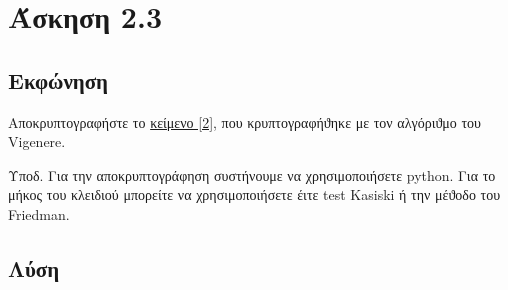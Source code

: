 \section{Άσκηση 2.3}

\subsection{Εκφώνηση} 

Αποκρυπτογραφήστε το \href{https://github.com/drazioti/book_crypto/blob/master/symmetric_crypto/vigenere}{κείμενο [2]}, που κρυπτογραφήϑηκε με τον αλγόριϑμο του Vigenere.

Υποδ. Για την αποκρυπτογράφηση συστήνουμε να χρησιμοποιήσετε python. Για το μήκος του κλειδιού μπορείτε να χρησιμοποιήσετε έιτε test Kasiski ή την μέϑοδο του Friedman.

\subsection{Λύση} 